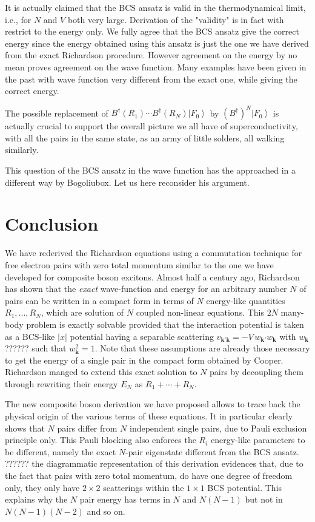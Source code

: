 \documentclass[aps,prb,amsmath,amssymb,superscriptaddress,twocolumn]{revtex4-1}
\newcommand{\vk}{\ensuremath{\mathbf{k}}}
\newcommand{\ket}[1]{\ensuremath{\left|#1\right>}}
\newcommand{\br}[1]{\ensuremath{\left(#1\right)}}
\providecommand{\abs}[1]{\ensuremath{\lvert{#1}\rvert}}
\newcommand{\fo}{\ensuremath{\ket{F_0}}}
\begin{document}
It is actually claimed that the BCS ansatz is valid in the thermodynamical limit, i.e., for $N$ and $V$ both very large.  Derivation of the "validity" is in fact with restrict to the energy only. We fully agree that the BCS ansatz give the correct energy since the energy obtained using this ansatz is just the one we have derived from the exact Richardson procedure.  However agreement on the energy by no mean proves agreement on the wave function. Many examples have been given in the past with wave function very different from the exact one, while giving the correct energy.  

The possible replacement of $B^{\dagger}(R_1)\cdots{}B^{\dagger}(R_N)\fo$ by $\br{B^{\dagger}}^N\fo$ is actually crucial to support the overall picture we all have of superconductivity, with all the pairs in the same state, as an army of little solders, all walking similarly.  

This question of the BCS ansatz in the wave function has the approached in a different way by Bogoliubox.  Let us here reconsider his argument.  

\section{Conclusion}
We have rederived the Richardson equations using a commutation technique for free electron pairs with zero total momentum similar to the one we have developed for composite boson excitons.  Almost half a century ago, Richardson has shown that the \emph{exact} wave-function and energy for an arbitrary number $N$ of pairs can be written in a compact form in terms of $N$ energy-like quantities $R_1,..., R_N$, which are solution of $N$ coupled non-linear equations.  This $2N$ many-body problem is exactly solvable provided that the interaction potential is taken as a BCS-like $\abs{x}$ potential having a separable scattering $v_{\vk'\vk}=-V\,w_{\vk'}w_{\vk}$ with $w_{\vk}$ ?????? such that $w_\vk^2=1$.  Note that these assumptions are already those necessary to get the energy of a single pair in the compact form obtained by Cooper.  Richardson manged to extend this exact solution to $N$ pairs by decoupling them through rewriting their energy $E_N$ as $R_1+\cdots+R_N$.

The new composite boson derivation we have proposed allows to trace back the physical origin of the various terms of these equations.  It in particular clearly shows that $N$ pairs differ from $N$ independent single pairs, due to Pauli exclusion principle only.  This Pauli blocking also enforces the $R_i$ energy-like parameters to be different, namely the exact $N$-pair eigenstate different from the BCS ansatz.  ?????? the diagrammatic representation of this derivation evidences that, due to the fact that pairs with zero total momentum, do have one degree of freedom only, they only have $2\times2$ scatterings within the $1\times1$ BCS potential. This explains why the $N$ pair energy has terms in $N$ and $N(N-1)$ but not in $N(N-1)(N-2)$ and so on.
\end{document}
